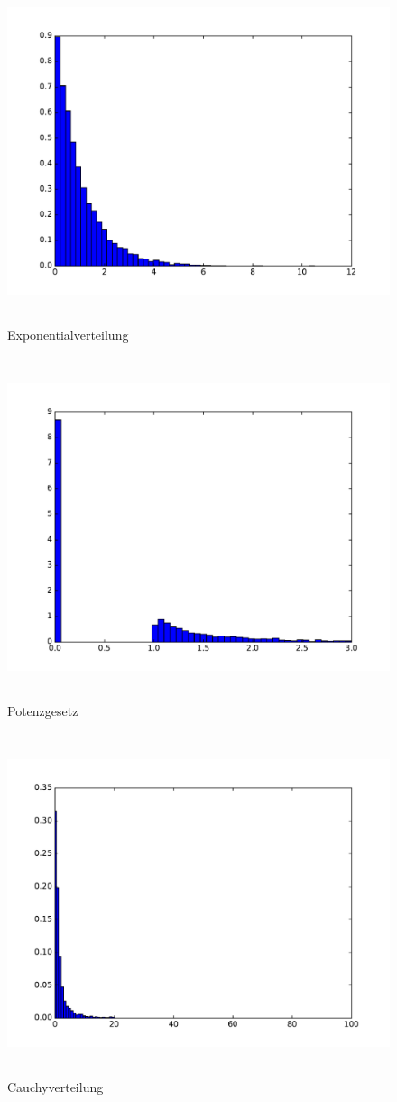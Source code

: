 \begin{figure}
  \centering
  \includegraphics[height=10cm]{Python/aufg3b.pdf}
  \caption{Exponentialverteilung}
\end{figure}
\begin{figure}
  \centering
  \includegraphics[height=10cm]{Python/aufg3c.pdf}
  \caption{Potenzgesetz}
\end{figure}
\begin{figure}
  \centering
  \includegraphics[height=10cm]{Python/aufg3d.pdf}
  \caption{Cauchyverteilung}
\end{figure}
